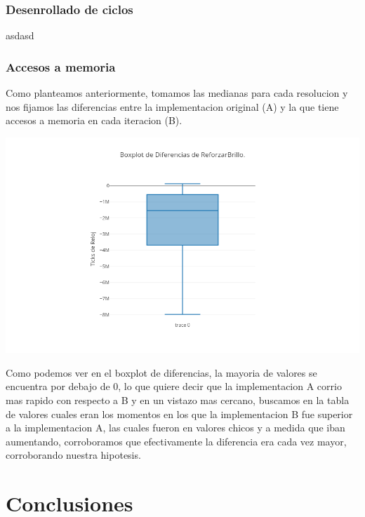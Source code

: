 \documentclass[a4paper]{article}
\begin{document}
\clearpage

\subsubsection{Desenrollado de ciclos}

asdasd

\subsubsection{Accesos a memoria}

Como planteamos anteriormente, tomamos las medianas para cada resolucion y nos fijamos las diferencias entre la implementacion original (A) y la que tiene accesos a memoria en cada iteracion (B).


\includegraphics[scale=0.5]{img/BoxplotReforzarBrillo.png}


Como podemos ver en el boxplot de diferencias, la mayoria de valores se encuentra por debajo de 0, lo que quiere decir que la implementacion A corrio mas rapido con respecto a B y en un vistazo mas cercano, buscamos en la tabla de valores cuales eran los momentos en los que la implementacion B fue superior a la implementacion A, las cuales fueron en valores chicos y a medida que iban aumentando, corroboramos que efectivamente la diferencia era cada vez mayor, corroborando nuestra hipotesis. 

\section{Conclusiones}
\end{document}
